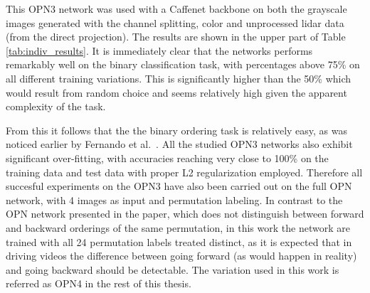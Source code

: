 This OPN3 network was used with a Caffenet backbone on both the grayscale images generated with the channel splitting, color and unprocessed lidar data (from the direct projection). The results are shown in the upper part of Table \ref{tab:indiv_results}. It is immediately clear that the networks performs remarkably well on the binary classification task, with percentages above 75\% on all different training variations. This is significantly higher than the 50\% which would result from random choice and seems relatively high given the apparent complexity of the task. 


From this it follows that the the binary ordering task is relatively easy, as was noticed earlier by Fernando et al.~\cite{fernando2017}. All the studied OPN3 networks also exhibit significant over-fitting, with accuracies reaching very close to 100\% on the training data and test data with proper L2 regularization employed. Therefore all succesful experiments on the OPN3 have also been carried out on the full OPN network\cite{lee2017}, with 4 images as input and permutation labeling. In contrast to the OPN network presented in the paper, which does not distinguish between forward and backward orderings of the same permutation, in this work the network are trained with all 24 permutation labels treated distinct, as it is expected that in driving videos the difference between going forward (as would happen in reality) and going backward should be detectable. The variation used in this work is referred as OPN4 in the rest of this thesis.

